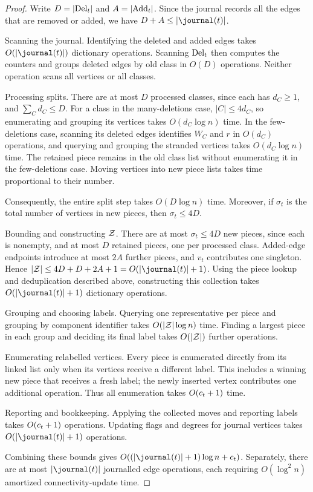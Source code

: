 \begin{proof}
    Write $ D= \left\lvert \mathrm{Del}_{t} \right \rvert $ and $ A= \left\lvert \mathrm{Add}_{t} \right \rvert $.
    Since the journal records all the edges that are removed or added, we have $ D+A\leq \jnTime{t} $.

    Scanning the journal.
    Identifying the deleted and added edges takes $ O(\jnTime{t}) $ dictionary operations.
    Scanning $\mathrm{Del}_{t}$ then computes the counters and groups deleted edges by old class in $O(D)$ operations.
    Neither operation scans all vertices or all classes.

    Processing splits. There are at most $D$ processed classes, since each has $d_C\ge1$, and $\sum_C d_C\le D.$
    For a class in the many-deletions case, $|C|\le4d_C$, so enumerating and grouping its vertices takes $O(d_C\log n)$ time.
    In the few-deletions case, scanning its deleted edges identifies $W_C$ and $r$ in $O(d_C)$ operations, and querying and grouping the stranded vertices takes $O(d_C\log n)$ time.
    The retained piece remains in the old class list without enumerating it in the few-deletions case.
    Moving vertices into new piece lists takes time proportional to their number.

    Consequently, the entire split step takes $O(D\log n)$ time.
    Moreover, if $\sigma_t$ is the total number of vertices in new pieces, then $\sigma_t\le4D.$

    Bounding and constructing $\mathcal{Z}$.
    There are at most $\sigma_t\le4D$ new pieces, since each is nonempty, and at most $D$ retained pieces, one per processed class.
    Added-edge endpoints introduce at most $2A$ further pieces, and $v_t$ contributes one singleton.
    Hence $|\piecesToMerge|\le4D+D+2A+1=O(\jnTime{t}+1)$.
    Using the piece lookup and deduplication described above, constructing this collection takes $O(\jnTime{t}+1)$ dictionary operations.

    Grouping and choosing labels.
    Querying one representative per piece and grouping by component identifier takes $O(|\mathcal{Z}|\log n)$ time.
    Finding a largest piece in each group and deciding its final label takes $O(|\mathcal{Z}|)$ further operations.

    Enumerating relabelled vertices.
    Every piece is enumerated directly from its linked list only when its vertices receive a different label.
    This includes a winning new piece that receives a fresh label; the newly inserted vertex contributes one additional operation.
    Thus all enumeration takes $O(c_{t}+1)$ time.

    Reporting and bookkeeping.
    Applying the collected moves and reporting labels takes $O(c_{t}+1)$ operations.
    Updating flags and degrees for journal vertices takes $O(\jnTime{t}+1)$ operations.

    Combining these bounds gives $O((\jnTime{t}+1)\log n+\nChangedVers{t})$.
    Separately, there are at most $\jnTime{t}$ journalled edge operations, each requiring $O(\log^2 n)$ amortized connectivity-update time.
\end{proof}

